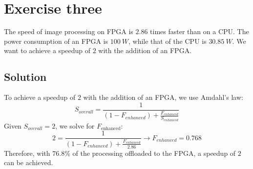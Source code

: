 \section{Exercise three}

The speed of image processing on FPGA is $2.86$ times faster than on a CPU. 
The power consumption of an FPGA is $100\:W$, while that of the CPU is $30.85\:W$.
We want to achieve a speedup of $2$ with the addition of an FPGA.

\subsection{Solution}
To achieve a speedup of $2$ with the addition of an FPGA, we use Amdahl's law:
\[S_{overall}=\dfrac{1}{\left(1-F_{enhanced}\right)+\frac{F_{enhanced}}{S_{enhanced}}}\]
Given $S_{overall} = 2$, we solve for $F_{\text{enhanced}}$:
\[2=\dfrac{1}{\left(1-F_{enhanced}\right)+\frac{F_{enhanced}}{2.86}}\rightarrow F_{enhanced}=0.768\]
Therefore, with $76.8\%$ of the processing offloaded to the FPGA, a speedup of $2$ can be achieved.